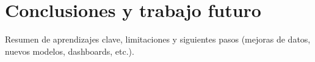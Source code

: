 \chapter{Conclusiones y trabajo futuro}

Resumen de aprendizajes clave, limitaciones y siguientes pasos (mejoras de datos, nuevos modelos, dashboards, etc.).
